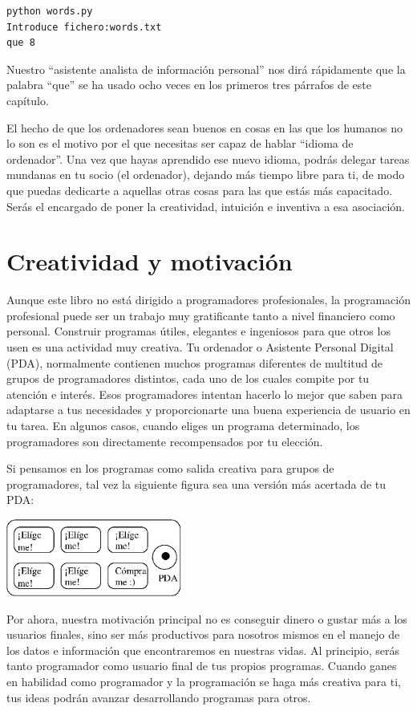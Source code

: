 \beforeverb
\begin{verbatim}
python words.py
Introduce fichero:words.txt
que 8
\end{verbatim}
\afterverb
%
Nuestro ``asistente analista de información personal'' nos dirá
rápidamente que la palabra ``que'' se ha usado ocho veces en los
primeros tres párrafos de este capítulo.

El hecho de que los ordenadores sean buenos en cosas
en las que los humanos no lo son es el motivo por el que necesitas
ser capaz de hablar ``idioma de ordenador''. Una vez que hayas
aprendido ese nuevo idioma, podrás delegar tareas mundanas
en tu socio (el ordenador), dejando más tiempo libre
para ti, de modo que puedas dedicarte a aquellas otras cosas
para las que estás más capacitado. Serás el encargado
de poner la creatividad, intuición e inventiva a esa
asociación.

\section{Creatividad y motivación}

Aunque este libro no está dirigido a programadores profesionales, la programación
profesional puede ser un trabajo muy gratificante tanto a nivel financiero como personal.
Construir programas útiles, elegantes e ingeniosos para que otros los usen
es una actividad muy creativa. Tu ordenador o Asistente Personal Digital (PDA),
normalmente contienen muchos programas diferentes de multitud de grupos de programadores
distintos, cada uno de los cuales compite por tu atención e interés.
Esos programadores intentan hacerlo lo mejor que saben para adaptarse a tus necesidades y
proporcionarte una buena experiencia de usuario en tu tarea. En algunos casos, cuando eliges un
programa determinado, los programadores son directamente recompensados por tu elección.

Si pensamos en los programas como salida creativa para grupos de programadores,
tal vez la siguiente figura sea una versión más acertada de tu PDA:

\beforefig
\centerline{\includegraphics[height=1.00in]{figs2/pda2.eps}}
\afterfig

Por ahora, nuestra motivación principal no es conseguir dinero o gustar más a los usuarios
finales, sino ser más productivos para nosotros mismos en el manejo de los datos e
información que encontraremos en nuestras vidas.
Al principio, serás tanto programador como usuario final de tus propios programas.
Cuando ganes en habilidad como programador y la programación se haga más creativa para ti,
tus ideas podrán avanzar desarrollando programas para otros.

